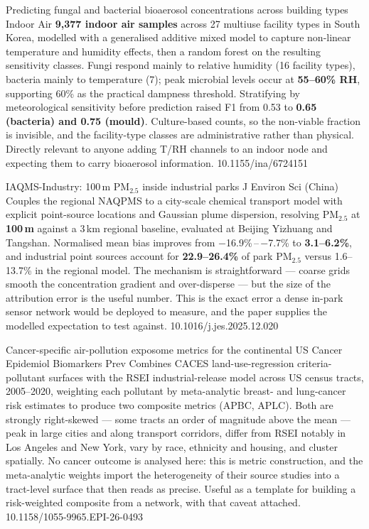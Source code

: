 \documentclass[10pt]{article}
\begin{document}
{Predicting fungal and bacterial bioaerosol concentrations across building types}
{Indoor Air}
{\textbf{9{,}377 indoor air samples} across 27 multiuse facility types in South Korea,
modelled with a generalised additive mixed model to capture non-linear temperature and
humidity effects, then a random forest on the resulting sensitivity classes. Fungi
respond mainly to relative humidity (16 facility types), bacteria mainly to temperature
(7); peak microbial levels occur at \textbf{55--60\% RH}, supporting 60\% as the practical
dampness threshold. Stratifying by meteorological sensitivity before prediction raised
F1 from 0.53 to \textbf{0.65 (bacteria) and 0.75 (mould)}. Culture-based counts, so the
non-viable fraction is invisible, and the facility-type classes are administrative rather
than physical. Directly relevant to anyone adding T/RH channels to an indoor node and
expecting them to carry bioaerosol information.}
{10.1155/ina/6724151}


{IAQMS-Industry: 100\,m PM$_{2.5}$ inside industrial parks}
{J Environ Sci (China)}
{Couples the regional NAQPMS to a city-scale chemical transport model with explicit
point-source locations and Gaussian plume dispersion, resolving PM$_{2.5}$ at
\textbf{100\,m} against a 3\,km regional baseline, evaluated at Beijing Yizhuang and
Tangshan. Normalised mean bias improves from $-$16.9\%\,--\,$-$7.7\% to
\textbf{3.1--6.2\%}, and industrial point sources account for \textbf{22.9--26.4\%} of
park PM$_{2.5}$ versus 1.6--13.7\% in the regional model. The mechanism is
straightforward --- coarse grids smooth the concentration gradient and over-disperse ---
but the size of the attribution error is the useful number. This is the exact error a
dense in-park sensor network would be deployed to measure, and the paper supplies the
modelled expectation to test against.}
{10.1016/j.jes.2025.12.020}

{Cancer-specific air-pollution exposome metrics for the continental US}
{Cancer Epidemiol Biomarkers Prev}
{Combines CACES land-use-regression criteria-pollutant surfaces with the RSEI
industrial-release model across US census tracts, 2005--2020, weighting each pollutant by
meta-analytic breast- and lung-cancer risk estimates to produce two composite metrics
(APBC, APLC). Both are strongly right-skewed --- some tracts an order of magnitude above
the mean --- peak in large cities and along transport corridors, differ from RSEI notably
in Los Angeles and New York, vary by race, ethnicity and housing, and cluster spatially.
No cancer outcome is analysed here: this is metric construction, and the meta-analytic
weights import the heterogeneity of their source studies into a tract-level surface that
then reads as precise. Useful as a template for building a risk-weighted composite from a
network, with that caveat attached.}
{10.1158/1055-9965.EPI-26-0493}
\end{document}
